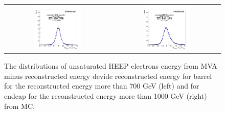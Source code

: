\begin{figure}[bh]
  \begin{center}
    \begin{tabular}{cc}
      \includegraphics[width=0.45\textwidth]{chapters/Zprime/Saturation/images/ZToEE/ZToEE_B700_E1000/fit_BDTG_Barrel_Endcap_B_reg_nos.png} &
      \includegraphics[width=0.45\textwidth]{chapters/Zprime/Saturation/images/ZToEE/ZToEE_B700_E1000/fit_BDTG_Barrel_Endcap_E_reg_nos.png} \\
    \end{tabular}
    \caption{ The distributions of unsaturated HEEP electrons energy from MVA minus reconstructed energy devide reconstructed energy for barrel for the reconstructed energy more than 700 GeV (left) and for endcap for the reconstructed energy more than 1000 GeV (right) from MC.}
    \label{fig:MC_2}
  \end{center}
\end{figure}


